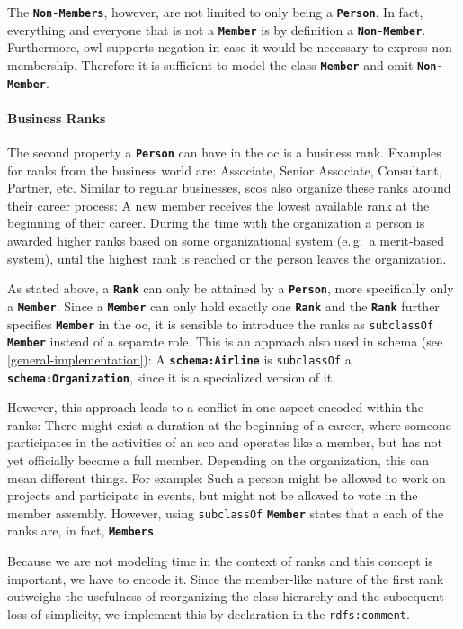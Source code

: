 \documentclass[a4paper, DIV=13, BCOR=0cm]{scrbook}
\newcommand{\eg}{e.\,g.\ }
\newcommand{\class}[1]{\texttt{\textbf{#1}}}
\newcommand{\relation}[1]{\texttt{#1}}
\newcommand{\prop}[1]{\texttt{#1}}
\begin{document}
The \class{Non-Members}, however, are not limited to only being a \class{Person}. In fact, everything and everyone that is not a \class{Member} is by definition a \class{Non-Member}. Furthermore, \gls{owl} supports negation in case it would be necessary to express non-membership. Therefore it is sufficient to model the class \class{Member} and omit \class{Non-Member}.

\paragraph{Business Ranks}
\label{ranks}
The second property a \class{Person} can have in the \gls{oc} is a business rank. Examples for ranks from the business world are: Associate, Senior Associate, Consultant, Partner, etc. Similar to regular businesses, \glspl{sco} also organize these ranks around their career process: A new member receives the lowest available rank at the beginning of their career. During the time with the organization a person is awarded higher ranks based on some organizational system (\eg a merit-based system), until the highest rank is reached or the person leaves the organization.

As stated above, a \class{Rank} can only be attained by a \class{Person}, more specifically only a \class{Member}. Since a \class{Member} can only hold exactly one \class{Rank} and the \class{Rank} further specifies \class{Member} in the \gls{oc}, it is sensible to introduce the ranks as \relation{subclassOf} \class{Member} instead of a separate role. This is an approach also used in \gls{schema} (see \autoref{general-implementation}): A \class{schema:Airline} is \relation{subclassOf} a \class{schema:Organization}, since it is a specialized version of it.

However, this approach leads to a conflict in one aspect encoded within the ranks: There might exist a duration at the beginning of a career, where someone participates in the activities of an \gls{sco} and operates like a member, but has not yet officially become a full member. Depending on the organization, this can mean different things. For example: Such a person might be allowed to work on projects and participate in events, but might not be allowed to vote in the member assembly. However, using \relation{subclassOf} \class{Member} states that a each of the ranks are, in fact, \class{Members}.

Because we are not modeling time in the context of ranks and this concept is important, we have to encode it. Since the member-like nature of the first rank outweighs the usefulness of reorganizing the class hierarchy and the subsequent loss of simplicity, we implement this by declaration in the \prop{rdfs:comment}.
\end{document}
